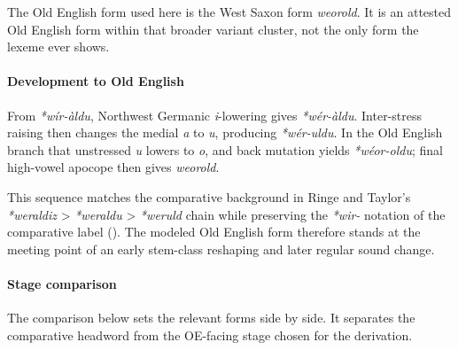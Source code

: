 \documentclass[
  british,
  a4paper,
]{article}
\begin{document}
The Old English form used here is the West Saxon form \emph{weorold}. It
is an attested Old English form within that broader variant cluster, not
the only form the lexeme ever shows.

\paragraph{Development to Old
English}\label{development-to-old-english-37}

From \emph{*wír-àldu}, Northwest Germanic \emph{i}-lowering gives
\emph{*wér-àldu}. Inter-stress raising then changes the medial \emph{a}
to \emph{u}, producing \emph{*wér-uldu}. In the Old English branch that
unstressed \emph{u} lowers to \emph{o}, and back mutation yields
\emph{*wéor-oldu}; final high-vowel apocope then gives \emph{weorold}.

This sequence matches the comparative background in Ringe and Taylor's
\emph{*weraldiz} \textgreater{} \emph{*weraldu} \textgreater{}
\emph{*weruld} chain while preserving the \emph{*wir-} notation of the
comparative label (). The modeled Old English form therefore stands at the meeting
point of an early stem-class reshaping and later regular sound change.

\paragraph{Stage comparison}\label{stage-comparison-3}

The comparison below sets the relevant forms side by side. It separates
the comparative headword from the OE-facing stage chosen for the
derivation.
\end{document}
